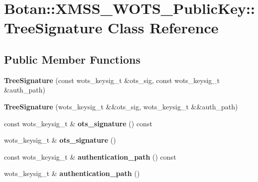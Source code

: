 \hypertarget{class_botan_1_1_x_m_s_s___w_o_t_s___public_key_1_1_tree_signature}{}\section{Botan\+:\+:X\+M\+S\+S\+\_\+\+W\+O\+T\+S\+\_\+\+Public\+Key\+:\+:Tree\+Signature Class Reference}
\label{class_botan_1_1_x_m_s_s___w_o_t_s___public_key_1_1_tree_signature}
\subsection*{Public Member Functions}
\begin{DoxyCompactItemize}
\item 
\mbox{\label{class_botan_1_1_x_m_s_s___w_o_t_s___public_key_1_1_tree_signature_a5ff1f923db177086f5a04bb7458b9ecd}} 
{\bfseries Tree\+Signature} (const wots\+\_\+keysig\+\_\+t \&ots\+\_\+sig, const wots\+\_\+keysig\+\_\+t \&auth\+\_\+path)
\item 
\mbox{\label{class_botan_1_1_x_m_s_s___w_o_t_s___public_key_1_1_tree_signature_a37c87809d1ef2ae742826f7fbc0fed4b}} 
{\bfseries Tree\+Signature} (wots\+\_\+keysig\+\_\+t \&\&ots\+\_\+sig, wots\+\_\+keysig\+\_\+t \&\&auth\+\_\+path)
\item 
\mbox{\label{class_botan_1_1_x_m_s_s___w_o_t_s___public_key_1_1_tree_signature_a11ab4a70dc8bc3d09bf6bac5682c83cf}} 
const wots\+\_\+keysig\+\_\+t \& {\bfseries ots\+\_\+signature} () const
\item 
\mbox{\label{class_botan_1_1_x_m_s_s___w_o_t_s___public_key_1_1_tree_signature_a2961306850409e885ee4fa282b3d39db}} 
wots\+\_\+keysig\+\_\+t \& {\bfseries ots\+\_\+signature} ()
\item 
\mbox{\label{class_botan_1_1_x_m_s_s___w_o_t_s___public_key_1_1_tree_signature_aee4728e8e9c74bbd4525dcd8768abb40}} 
const wots\+\_\+keysig\+\_\+t \& {\bfseries authentication\+\_\+path} () const
\item 
\mbox{\label{class_botan_1_1_x_m_s_s___w_o_t_s___public_key_1_1_tree_signature_a6ef6c3aea431f897fb57641d7c9f3c46}} 
wots\+\_\+keysig\+\_\+t \& {\bfseries authentication\+\_\+path} ()
\end{DoxyCompactItemize}


